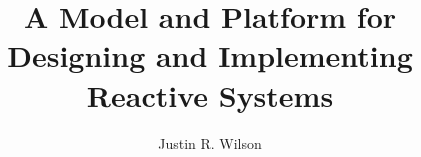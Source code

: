 \documentclass[letterpaper]{article}
\title{A Model and Platform for Designing and Implementing Reactive Systems}
\author{Justin R. Wilson}
\date{}
\begin{document}
\maketitle
















{}
\end{document}
